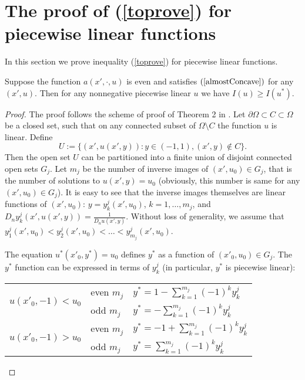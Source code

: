 \section{The proof of (\ref{toprove}) for piecewise linear functions}

In this section we prove inequality (\ref{toprove}) for piecewise linear functions.

\begin{lm}
Suppose the function $a(x', \cdot, u)$ is even and satisfies $(\ref{almostConcave})$ for any $(x', u)$.
Then for any nonnegative piecewise linear $u$ we have $I( u ) \ge I( u^* )$.
\end{lm}

\begin{proof}
The proof follows the scheme of proof of Theorem 2 in \cite{1dim}.
Let $\partial \Omega \subset C \subset \Omega$ be a closed set, such that on any connected subset of $\Omega \setminus C$ the function $u$ is linear.
Define $$U := \{ ( x', u( x', y ) ): y \in (-1, 1), (x', y) \not\in C \}.$$
Then the open set $U$ can be partitioned into a finite union of disjoint connected open sets $G_j$.
Let $m_j$ be the number of inverse images of $( x', u_0 ) \in G_j$, that is the number of solutions to $u( x', y ) = u_0$
(obviously, this number is same for any $( x', u_0 ) \in G_j$).
It is easy to see that the inverse images themselves are linear functions of $( x', u_0 )$:
$y = y_k^j( x', u_0 )$, $k = 1, \dots, m_j$,
and $D_n y_k^j( x', u( x', y ) ) = \frac{1}{D_n u( x', y )}$.
Without loss of generality, we assume that $y_1^j(x', u_0) < y_2^j(x', u_0) < \dots < y_{m_j}^j(x', u_0)$.

The equation $u^*(x'_0, y^*) = u_0$ defines $y^*$ as a function of $( x'_0, u_0 ) \in G_j$.
The $y^*$ function can be expressed in terms of $y_k^j$ (in particular, $y^*$ is piecewise linear):

\begin{center}
\begin{tabular}{l|l|l}
\multirow{2}{*}{$u( x'_0, -1 ) < u_0$ \rule[-34pt]{0pt}{65pt}} & even $m_j$ & $y^* = 1-\sum\limits_{k=1}^{m_j} (-1)^k y_k^j$ \rule[-17pt]{0pt}{40pt} \\
                                                               & odd $m_j$  & $y^* = -\sum\limits_{k=1}^{m_j} (-1)^k y_k^j$ \rule[-17pt]{0pt}{40pt} \\ \hline
\multirow{2}{*}{$u( x'_0, -1 ) > u_0$ \rule[-34pt]{0pt}{65pt}} & even $m_j$ & $y^* = -1+\sum\limits_{k=1}^{m_j} (-1)^k y_k^j$ \rule[-17pt]{0pt}{40pt} \\
                                                               & odd $m_j$  & $y^* = \sum\limits_{k=1}^{m_j} (-1)^k y_k^j$ \rule[-17pt]{0pt}{40pt} \\
\end{tabular}
\end{center}


\end{proof}
